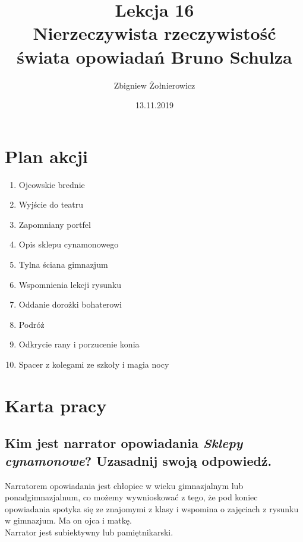 \documentclass[a4paper]{article}
\begin{document}
\title{{\huge Lekcja 16} \\
{\large Nierzeczywista rzeczywistość świata opowiadań Bruno Schulza}}
\author{Zbigniew Żołnierowicz}
\date{13.11.2019}
\maketitle
\section{Plan akcji}
\begin{enumerate}
    \item Ojcowskie brednie
    \item Wyjście do teatru
    \item Zapomniany portfel
    \item Opis sklepu cynamonowego
    \item Tylna ściana gimnazjum
    \item Wspomnienia lekcji rysunku
    \item Oddanie dorożki bohaterowi
    \item Podróż
    \item Odkrycie rany i porzucenie konia
    \item Spacer z kolegami ze szkoły i magia nocy
\end{enumerate}
\section{Karta pracy}
\subsection{Kim jest narrator opowiadania \emph{Sklepy cynamonowe}? Uzasadnij swoją odpowiedź.}
Narratorem opowiadania jest chłopiec w wieku gimnazjalnym lub ponadgimnazjalnum, co możemy wywnioskować z tego,
że pod koniec opowiadania spotyka się ze znajomymi z klasy i wspomina o zajęciach z rysunku w gimnazjum. Ma on ojca i matkę.
\\ Narrator jest subiektywny lub pamiętnikarski.
\pagebreak
\end{document}

